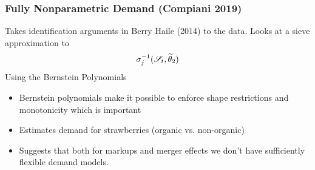 \documentclass[aspectratio=169,11pt]{beamer}
\begin{document}
\begin{frame}
\frametitle{Fully Nonparametric Demand (Compiani 2019)}
Takes identification arguments in Berry Haile (2014) to the data. Looks at a sieve approximation to
\begin{align*}
\sigma_{j}^{-1}(\mathscr{S}_t,\widetilde{\theta}_2)
\end{align*}
Using the \alert{Bernstein Polynomials}
\begin{itemize}
\item Bernstein polynomials make it possible to enforce shape restrictions and \alert{monotonicity} which is important
\item Estimates demand for strawberries (organic vs. non-organic)
\item Suggests that both for markups and merger effects we don't have sufficiently flexible demand models.
\end{itemize}
\end{frame}


%
%



%
\end{document}
